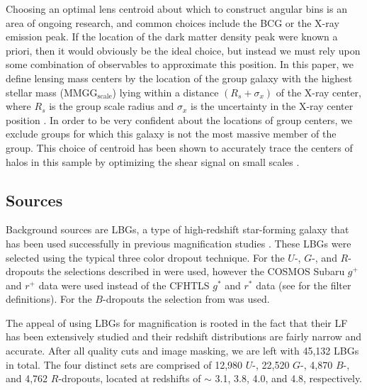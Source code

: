 Choosing an optimal lens centroid about which to construct angular bins is an area of ongoing research, and common choices include the \acf{BCG} or the X-ray emission peak. If the location of the dark matter density peak were known a priori, then it would obviously be the ideal choice, but instead we must rely upon some combination of observables to approximate this position. In this paper, we define lensing mass centers by the location of the group galaxy with the highest stellar mass (MMGG$_\mathrm{scale}$) lying within a distance $ (R_s + \sigma_x) $ of the X-ray center, where $ R_s $ is the group scale radius and $ \sigma_x $ is the uncertainty in the X-ray center position \citep{George11}.  In order to be very confident about the locations of group centers, we exclude groups for which this galaxy is not the most massive member of the group. This choice of centroid has been shown to accurately trace the centers of halos in this sample by optimizing the shear signal on small scales \citep{George12}.

\subsection{Sources}
Background sources are \ac{LBG}s, a type of high-redshift star-forming galaxy that has been used successfully in previous magnification studies \citep[see][]{Hildebrandt09b, Hildebrandt11}. These \ac{LBG}s were selected using the typical three color dropout technique. For the $U$-, $G$-, and $R$-dropouts the selections described in \citet{Hildebrandt09a} were used, however the \ac{COSMOS} Subaru $g^+$ and $r^+$ data were used instead of the \acf{CFHTLS} $g^*$ and $r^*$ data (see \citet{Capak07} for the filter definitions). For the $B$-dropouts the selection from \citet{Ouchi04} was used.  

The appeal of using \ac{LBG}s for magnification is rooted in the fact that their \acf{LF} has been extensively studied and their redshift distributions are fairly narrow and accurate.  After all quality cuts and image masking, we are left with 45,132 \ac{LBG}s in total.  The four distinct sets are comprised of 12,980 $U$-, 22,520 $G$-, 4,870 $B$-, and 4,762 $R$-dropouts, located at redshifts of $\sim$ 3.1, 3.8, 4.0, and 4.8, respectively.

